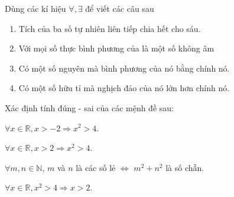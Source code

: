 \begin{bt}%
	Dùng các kí hiệu $\forall, \exists $ để viết các câu sau
	\begin{enumerate}
		\item Tích của ba số tự nhiên liên tiếp chia hết cho sáu.
		\item Với mọi số thực bình phương của là một số không âm
		\item Có một số nguyên mà bình phương của nó bằng chính nó.
		\item Có một số hữu tỉ mà nghịch đảo của nó lớn hơn chính nó.
	\end{enumerate}
\end{bt}

\begin{bt}%
	Xác định tính đúng - sai của các mệnh đề sau:
	\begin{listEX}[1]
		\item $\forall x\in \mathbb{R},x>-2 \Rightarrow x^2>4$.
		\item $\forall x\in \mathbb{R},x>2 \Rightarrow x^2>4$.
		\item $\forall m,n\in \mathbb{N}$, $m$ và $n$ là các số lẻ $ \Leftrightarrow $ $m^2+n^2$ là số chẵn.
		\item $\forall x\in \mathbb{R},x^2>4 \Rightarrow x>2$.
	\end{listEX}
\end{bt}

